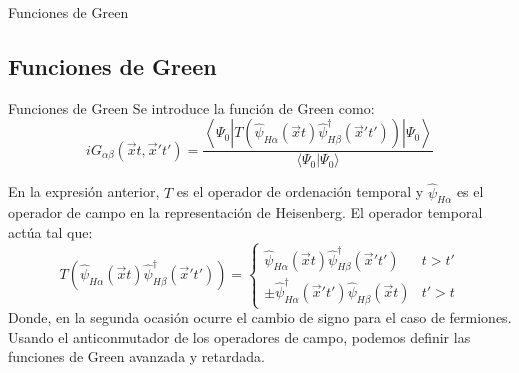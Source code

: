 \documentclass{beamer}
\begin{document}
\begin{frame}{Funciones de Green \cite{fetter1971quantum}}
    \subsection{Funciones de Green}
    \begin{block}{Funciones de Green}
        Se introduce la función de Green como:
        \begin{equation}
            iG_{\alpha\beta}(\vec{x}t, \vec{x}'t') = \frac{\left\langle\Psi_0|T\left(\hat{\psi}_{H\alpha}(\vec{x}t)\hat{\psi}^{\dagger}_{H\beta}(\vec{x}'t')\right)|\Psi_0\right\rangle}{\langle\Psi_0|\Psi_0\rangle}
            \label{eq:GreenFunction}
        \end{equation}
    \end{block}
    En la expresión anterior, $T$ es el operador de ordenación temporal y $\hat{\psi}_{H\alpha}$ es el operador de campo en la representación de Heisenberg. El operador temporal actúa tal que:
    \begin{equation}
        T\left(\hat{\psi}_{H\alpha}(\vec{x}t)\hat{\psi}^{\dagger}_{H\beta}(\vec{x}'t')\right) = \left\{\begin{array}{cc}
        \hat{\psi}_{H\alpha}(\vec{x}t)\hat{\psi}^{\dagger}_{H\beta}(\vec{x}'t') & t > t' \\
        \pm\hat{\psi}_{H\alpha}^{\dagger}(\vec{x}'t')\hat{\psi}_{H\beta}(\vec{x}t) & t' > t
        \end{array}\right.
    \end{equation}
    Donde, en la segunda ocasión ocurre el cambio de signo para el caso de fermiones. Usando el anticonmutador de los operadores de campo, podemos definir las funciones de Green avanzada y retardada.
\end{frame}
\end{document}
